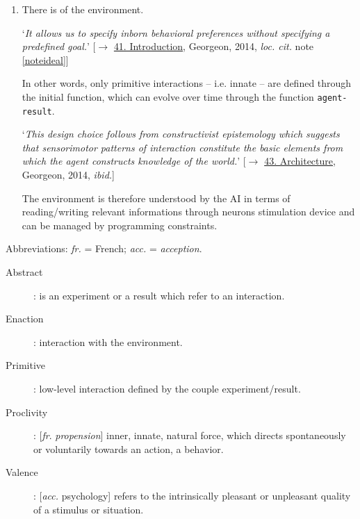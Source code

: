 \begin{enumerate}[leftmargin=0cm,itemindent=.5cm,labelwidth=\itemindent,labelsep=0cm,align=left]
\item There is  of the environment. 

\smallskip

`\textit{It allows us to specify inborn behavioral preferences without specifying a predefined goal.}' [$\rightarrow$ \href{https://projet.liris.cnrs.fr/ideal/mooc/lesson.php?n=041}{41. Introduction}, Georgeon, 2014, \textit{loc. cit.} note \ref{noteideal}]

\smallskip

In other words, only primitive interactions -- i.e. innate -- are defined through the initial function, which can evolve over time through the function \texttt{agent-result}. 

\smallskip

`\textit{This design choice follows from constructivist epistemology which suggests that sensorimotor patterns of interaction constitute the basic elements from which the agent constructs knowledge of the world.}' [$\rightarrow$ \href{https://projet.liris.cnrs.fr/ideal/mooc/lesson.php?n=043}{43. Architecture}, Georgeon, 2014, \textit{ibid.}] 

\smallskip

The environment is therefore understood by the AI in terms of reading/writing relevant informations through neurons stimulation device and can be managed by programming constraints.
\end{enumerate}

\bigskip
\bigskip


\bigskip

Abbreviations: \textsl{fr.} = French; \textsl{acc.} = \textit{acception}.

\begin{description}
\item[Abstract]: is an experiment or a result which refer to an interaction.
\item[Enaction]: interaction with the environment.
\item[Primitive]: low-level interaction defined by the couple experiment/result.\item[Proclivity]: [\textsl{fr}. \textit{propension}] inner, innate, natural force, which directs spontaneously or voluntarily towards an action, a behavior.
\item[Valence]:  [\textsl{acc.} psychology] refers to the intrinsically pleasant or unpleasant quality of a stimulus or situation.
\end{description}

